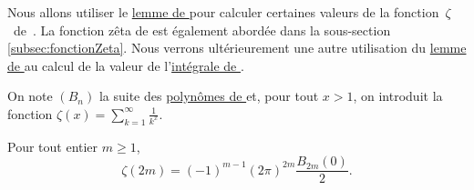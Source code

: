 %
%


\bigskip

Nous allons utiliser le \hyperref[lemmeLebesgue]{lemme de } pour calculer certaines valeurs de la fonction~$\zeta$~de~. La fonction zêta de  est également abordée dans la sous-section \ref{subsec:fonctionZeta}. Nous verrons ultérieurement une autre utilisation du \hyperref[lemmeLebesgue]{lemme de } au calcul de la valeur de l'\hyperref[sec:intDirichlet]{intégrale de }.

On note $(B_n)$ la suite des \hyperref[sec:polynomes_de_bernoulli]{polynômes de } et, pour tout $x > 1$, on introduit la fonction $\zeta(x) = \sum\limits_{k=1}^{\infty} \frac{1}{k^x}$.

\begin{theo}
Pour tout entier $m \geqslant 1$, 
\[
\zeta(2m) = (-1)^{m-1} (2 \pi)^{2m} \frac{B_{2m}(0)}{2}.
\]
\end{theo}

